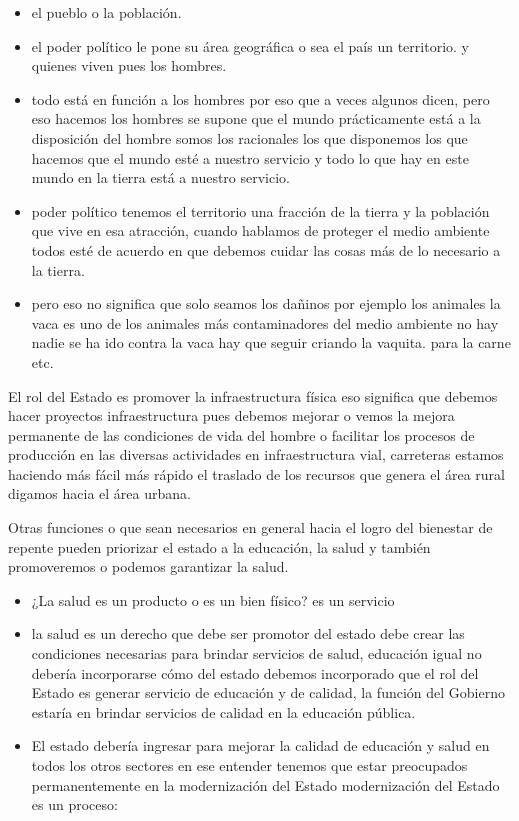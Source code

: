 \documentclass[
  a4paper,
]{article}
\providecommand{\tightlist}{%
  \setlength{\itemsep}{0pt}\setlength{\parskip}{0pt}}\usepackage{longtable,booktabs,array}
\begin{document}
\begin{itemize}
\tightlist
\item
  el pueblo o la población.
\item
  el poder político le pone su área geográfica o sea el país un
  territorio. y quienes viven pues los hombres.
\item
  todo está en función a los hombres por eso que a veces algunos dicen,
  pero eso hacemos los hombres se supone que el mundo prácticamente está
  a la disposición del hombre somos los racionales los que disponemos
  los que hacemos que el mundo esté a nuestro servicio y todo lo que hay
  en este mundo en la tierra está a nuestro servicio.
\item
  poder político tenemos el territorio una fracción de la tierra y la
  población que vive en esa atracción, cuando hablamos de proteger el
  medio ambiente todos esté de acuerdo en que debemos cuidar las cosas
  más de lo necesario a la tierra.
\item
  pero eso no significa que solo seamos los dañinos por ejemplo los
  animales la vaca es uno de los animales más contaminadores del medio
  ambiente no hay nadie se ha ido contra la vaca hay que seguir criando
  la vaquita. para la carne etc.
\end{itemize}

El rol del Estado es promover la infraestructura física eso significa
que debemos hacer proyectos infraestructura pues debemos mejorar o vemos
la mejora permanente de las condiciones de vida del hombre o facilitar
los procesos de producción en las diversas actividades en
infraestructura vial, carreteras estamos haciendo más fácil más rápido
el traslado de los recursos que genera el área rural digamos hacia el
área urbana.

Otras funciones o que sean necesarios en general hacia el logro del
bienestar de repente pueden priorizar el estado a la educación, la salud
y también promoveremos o podemos garantizar la salud.

\begin{itemize}
\tightlist
\item
  ¿La salud es un producto o es un bien físico? es un servicio
\item
  la salud es un derecho que debe ser promotor del estado debe crear las
  condiciones necesarias para brindar servicios de salud, educación
  igual no debería incorporarse cómo del estado debemos incorporado que
  el rol del Estado es generar servicio de educación y de calidad, la
  función del Gobierno estaría en brindar servicios de calidad en la
  educación pública.
\item
  El estado debería ingresar para mejorar la calidad de educación y
  salud en todos los otros sectores en ese entender tenemos que estar
  preocupados permanentemente en la modernización del Estado
  modernización del Estado es un proceso:
\end{itemize}
\end{document}
